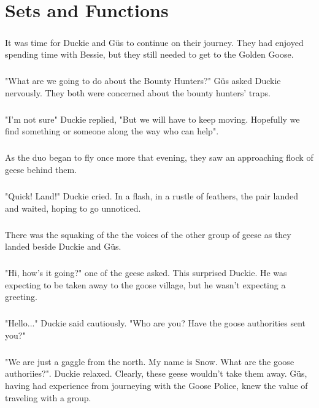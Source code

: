 \chapter{Sets and Functions}
\paragraph{} It was time for Duckie and G{\"u}s to continue on their journey. They had enjoyed spending time with Bessie, but they still needed to get to the Golden Goose.
\paragraph{} "What are we going to do about the Bounty Hunters?" G{\"u}s asked Duckie nervously. They both were concerned about the bounty hunters' traps.
\paragraph{} "I'm not sure" Duckie replied, "But we will have to keep moving. Hopefully we find something or someone along the way who can help".
\paragraph{} As the duo began to fly once more that evening, they saw an approaching flock of geese behind them.
\paragraph{} "Quick! Land!" Duckie cried. In a flash, in a rustle of feathers, the pair landed and waited, hoping to go unnoticed.
\paragraph{} There was the squaking of the the voices of the other group of geese as they landed beside Duckie and G{\"u}s.
\paragraph{} "Hi, how's it going?" one of the geese asked. This surprised Duckie. He was expecting to be taken away to the goose village, but he wasn't expecting a greeting.
\paragraph{} "Hello..." Duckie said cautiously. "Who are you? Have the goose authorities sent you?"
\paragraph{} "We are just a gaggle from the north. My name is Snow. What are the goose authoriies?". Duckie relaxed. Clearly, these geese wouldn't take them away. G{\"u}s, having had experience from journeying with the Goose Police, knew the value of traveling with a group.
